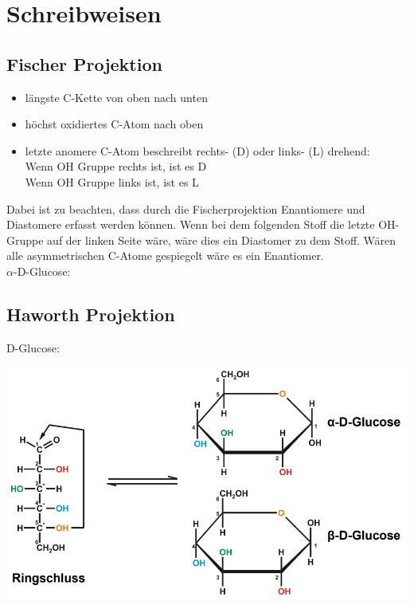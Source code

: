 \section{Schreibweisen}

\subsection{Fischer Projektion}
\label{sec:fischer}
\begin{itemize}
    \item längste C-Kette von oben nach unten
    \item höchst oxidiertes C-Atom nach oben
    \item letzte anomere C-Atom beschreibt rechts- (D) oder links- (L) drehend: \\
        Wenn OH Gruppe rechts ist, ist es D\\
        Wenn OH Gruppe links ist, ist es L
\end{itemize}

Dabei ist zu beachten, dass durch die Fischerprojektion Enantiomere und Diastomere erfasst werden können. 
Wenn bei dem folgenden Stoff die letzte OH-Gruppe auf der linken Seite wäre, wäre dies ein Diastomer zu dem Stoff. 
Wären alle asymmetrischen C-Atome gespiegelt wäre es ein Enantiomer. \\
$\alpha$-D-Glucose:


\subsection{Haworth Projektion}
\label{sec:haworth}
D-Glucose:

\includegraphics[scale=0.86]{media/naturstoffe/haworth.png}

